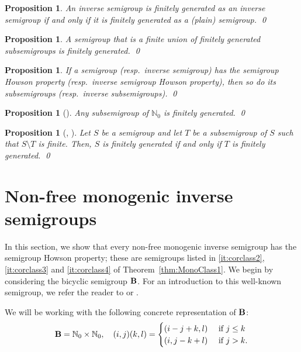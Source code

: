 \documentclass[reqno]{amsart}
\theoremstyle{plain}
\newtheorem{prop}[lem]{Proposition}
\theoremstyle{definition}
\DeclareMathOperator{\B}{\textup{\textbf{B}}}
\numberwithin{equation}{section}
\begin{document}
\begin{prop}
\label{prop:invplaingen}
An inverse semigroup is finitely generated as an inverse semigroup if and only if it is finitely generated as a (plain) semigroup. \hfill\qed
\end{prop}

\begin{prop}
\label{prop:unionfg}
A semigroup that is a finite union of finitely generated subsemigroups is finitely generated. \hfill\qed
\end{prop}

\begin{prop}
\label{prop:subHowson}
If a semigroup (resp.\ inverse semigroup) has the semigroup Howson property (resp.\ inverse semigroup Howson property), then so do its subsemigroups (resp.\ inverse subsemigroups). \hfill\qed
\end{prop}

\begin{prop}[\cite{SitSiu}]
\label{prop:SitSiu}
Any subsemigroup of $\mathbb{N}_0$ is finitely generated. \hfill\qed
\end{prop}

\begin{prop}[{\cite{Jura}, \cite[Theorem 1.1]{RuskucLarge}}]
\label{prop:FiniteGenerationLarge}
Let $S$ be a semigroup and let $T$ be a subsemigroup of $S$ such that $S\setminus T$ is finite. Then, $S$ is finitely generated if and only if $T$ is finitely generated. \hfill\qed
\end{prop}



\section{Non-free monogenic inverse semigroups}
\label{sec:NonFree}


In this section, we show that every non-free monogenic inverse semigroup has the semigroup Howson property; these are semigroups listed in  \ref{it:corclass2}, \ref{it:corclass3} and \ref{it:corclass4} of Theorem~\ref{thm:MonoClass1}. 
We begin by considering the bicyclic semigroup $\B$. For an introduction to this well-known semigroup, we refer the reader to \cite[Chapter 1]{Howie} or \cite[Chapter 3]{Lawson}.


We will be working with the following concrete representation of $\B$:
\[
\B=\mathbb{N}_0\times\mathbb{N}_0,\quad 
(i,j)(k,l)=
\begin{cases}
(i-j+k,l) & \text{ if } j \leq k \\
(i,j-k+l) & \text{ if } j > k.
\end{cases}
\]
\end{document}
